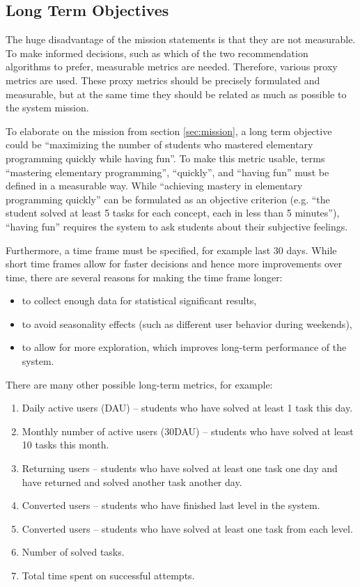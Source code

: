 \subsection{Long Term Objectives}
\label{sec:long-term-objectives}

The huge disadvantage of the mission statements
  is that they are not measurable.
To make informed decisions,
  such as which of the two recommendation algorithms to prefer,
  measurable metrics are needed.
Therefore, various proxy metrics are used.
These proxy metrics should be precisely formulated and measurable,
  but at the same time they should be related as much as possible to the system mission.

To elaborate on the mission from section \ref{sec:mission},
  a long term objective could be
  ``maximizing the number of students
  who mastered elementary programming quickly while having fun''.
To make this metric usable,
  terms ``mastering elementary programming'', ``quickly'', and ``having fun''
  must be defined in a measurable way.
While ``achieving mastery in elementary programming quickly'' can be
  formulated as an objective criterion
  (e.g. ``the student solved at least 5 tasks for each concept, each in less than 5 minutes''),
  ``having fun'' requires the system to ask students about their subjective feelings.

Furthermore, a time frame must be specified, for example last 30 days.
While short time frames allow for faster decisions and hence more improvements over time,
there are several reasons for making the time frame longer:
\begin{itemize}
  \item to collect enough data for statistical significant results,
  \item to avoid seasonality effects (such as different user behavior during weekends),
  \item to allow for more exploration, which improves long-term performance of the system.
\end{itemize}

There are many other possible long-term metrics, for example:
\begin{enumerate}
  \item Daily active users (DAU) -- students who have solved at least 1 task this day.
  \item Monthly number of active users (30DAU) -- students who have solved at least 10 tasks this month.
  \item Returning users -- students who have solved at least one task one day and have returned and solved another task another day.
  \item Converted users -- students who have finished last level in the system.
  \item Converted users -- students who have solved at least one task from each level.
  \item Number of solved tasks.
  \item Total time spent on successful attempts.
\end{enumerate}

